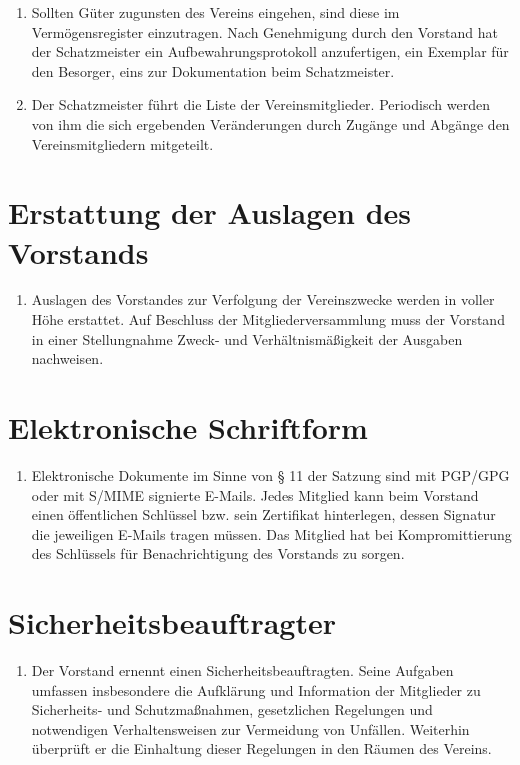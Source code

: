 \documentclass[fontsize=12pt,paper=a4,pagesize,headings=small]{scrartcl}
\begin{document}
\begin{enumerate}
    \item Sollten Güter zugunsten des Vereins eingehen, sind diese im
        Vermögensregister einzutragen. Nach Genehmigung durch den Vorstand hat
        der Schatzmeister ein Aufbewahrungsprotokoll anzufertigen, ein Exemplar
        für den Besorger, eins zur Dokumentation beim Schatzmeister.

    \item Der Schatzmeister führt die Liste der Vereinsmitglieder.
        Periodisch werden von ihm die sich ergebenden Veränderungen durch
        Zugänge und Abgänge den Vereinsmitgliedern mitgeteilt.
\end{enumerate}

\section{Erstattung der Auslagen des Vorstands}
\begin{enumerate}
    \item Auslagen des Vorstandes zur Verfolgung der Vereinszwecke werden
        in voller Höhe erstattet. Auf Beschluss der Mitgliederversammlung
        muss der Vorstand in einer Stellungnahme Zweck- und
        Verhältnismäßigkeit der Ausgaben nachweisen.
\end{enumerate}


\section{Elektronische Schriftform}
\begin{enumerate}
    \item Elektronische Dokumente im Sinne von § 11 der Satzung sind mit
        PGP/GPG oder mit S/MIME signierte E-Mails. Jedes Mitglied kann beim
        Vorstand einen öffentlichen Schlüssel bzw. sein Zertifikat
        hinterlegen, dessen Signatur die jeweiligen E-Mails tragen müssen.
        Das Mitglied hat bei Kompromittierung des Schlüssels für
        Benachrichtigung des Vorstands zu sorgen.
\end{enumerate}


\section{Sicherheitsbeauftragter}
\begin{enumerate}
    \item Der Vorstand ernennt einen Sicherheitsbeauftragten. Seine
        Aufgaben umfassen insbesondere die Aufklärung und Information der
        Mitglieder zu Sicherheits- und Schutzmaßnahmen, gesetzlichen
        Regelungen und notwendigen Verhaltensweisen zur Vermeidung von
        Unfällen. Weiterhin überprüft er die Einhaltung dieser Regelungen in
        den Räumen des Vereins.
\end{enumerate}
\end{document}
